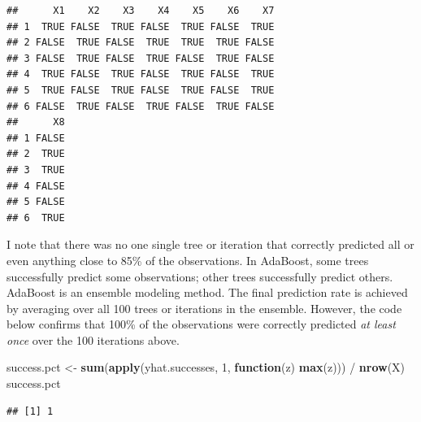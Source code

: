 \documentclass[]{tufte-handout}
\newenvironment{Shaded}{}{}
\newcommand{\KeywordTok}[1]{\textcolor[rgb]{0.00,0.44,0.13}{\textbf{#1}}}
\newcommand{\DecValTok}[1]{\textcolor[rgb]{0.25,0.63,0.44}{#1}}
\newcommand{\StringTok}[1]{\textcolor[rgb]{0.25,0.44,0.63}{#1}}
\newcommand{\ControlFlowTok}[1]{\textcolor[rgb]{0.00,0.44,0.13}{\textbf{#1}}}
\newcommand{\OperatorTok}[1]{\textcolor[rgb]{0.40,0.40,0.40}{#1}}
\newcommand{\NormalTok}[1]{#1}
\begin{document}
\begin{Shaded}
\end{Shaded}

\begin{verbatim}
##      X1    X2    X3    X4    X5    X6    X7
## 1  TRUE FALSE  TRUE FALSE  TRUE FALSE  TRUE
## 2 FALSE  TRUE FALSE  TRUE  TRUE  TRUE FALSE
## 3 FALSE  TRUE FALSE  TRUE FALSE  TRUE FALSE
## 4  TRUE FALSE  TRUE FALSE  TRUE FALSE  TRUE
## 5  TRUE FALSE  TRUE FALSE  TRUE FALSE  TRUE
## 6 FALSE  TRUE FALSE  TRUE FALSE  TRUE FALSE
##      X8
## 1 FALSE
## 2  TRUE
## 3  TRUE
## 4 FALSE
## 5 FALSE
## 6  TRUE
\end{verbatim}

I note that there was no one single tree or iteration that correctly
predicted all or even anything close to 85\% of the observations. In
AdaBoost, some trees successfully predict some observations; other trees
successfully predict others. AdaBoost is an ensemble modeling method.
The final prediction rate is achieved by averaging over all 100 trees or
iterations in the ensemble. However, the code below confirms that 100\%
of the observations were correctly predicted \emph{at least once} over
the 100 iterations above.

\begin{Shaded}
\begin{Highlighting}[]
\NormalTok{success.pct <-}\StringTok{ }\KeywordTok{sum}\NormalTok{(}\KeywordTok{apply}\NormalTok{(yhat.successes, }\DecValTok{1}\NormalTok{, }\ControlFlowTok{function}\NormalTok{(z) }\KeywordTok{max}\NormalTok{(z))) }\OperatorTok{/}\StringTok{ }\KeywordTok{nrow}\NormalTok{(X) }
\NormalTok{success.pct}
\end{Highlighting}
\end{Shaded}

\begin{verbatim}
## [1] 1
\end{verbatim}
\end{document}
